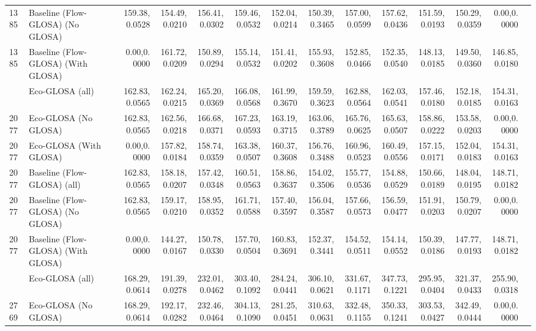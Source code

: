 \begin{table}[ht]
{\begin{tabular}{llrrrrrrrrrrrr}
        1385 & Baseline (Flow-GLOSA) (No GLOSA)   & 159.38,0.0528 & 154.49,0.0210 & 156.41,0.0302 & 159.46,0.0532 & 152.04,0.0214 & 150.39,0.3465 & 157.00,0.0599 & 157.62,0.0436 & 151.59,0.0193 & 150.29,0.0359 & 0.00,0.0000   \\
        1385 & Baseline (Flow-GLOSA) (With GLOSA) & 0.00,0.0000   & 161.72,0.0209 & 150.89,0.0294 & 155.14,0.0532 & 151.41,0.0202 & 155.93,0.3608 & 152.85,0.0466 & 152.35,0.0540 & 148.13,0.0185 & 149.50,0.0360 & 146.85,0.0180 \\
        \addlinespace
        2077 & Eco-GLOSA (all)                    & 162.83,0.0565 & 162.24,0.0215 & 165.20,0.0369 & 166.08,0.0568 & 161.99,0.3670 & 159.59,0.3623 & 162.88,0.0564 & 162.03,0.0541 & 157.46,0.0180 & 152.18,0.0185 & 154.31,0.0163 \\
        2077 & Eco-GLOSA (No GLOSA)               & 162.83,0.0565 & 162.56,0.0218 & 166.68,0.0371 & 167.23,0.0593 & 163.19,0.3715 & 163.06,0.3789 & 165.76,0.0625 & 165.63,0.0507 & 158.86,0.0222 & 153.58,0.0203 & 0.00,0.0000   \\
        2077 & Eco-GLOSA (With GLOSA)             & 0.00,0.0000   & 157.82,0.0184 & 158.74,0.0359 & 163.38,0.0507 & 160.37,0.3608 & 156.76,0.3488 & 160.96,0.0523 & 160.49,0.0556 & 157.15,0.0171 & 152.04,0.0183 & 154.31,0.0163 \\
        2077 & Baseline (Flow-GLOSA) (all)        & 162.83,0.0565 & 158.18,0.0207 & 157.42,0.0348 & 160.51,0.0563 & 158.86,0.3637 & 154.02,0.3506 & 155.77,0.0536 & 154.88,0.0529 & 150.66,0.0189 & 148.04,0.0195 & 148.71,0.0182 \\
        2077 & Baseline (Flow-GLOSA) (No GLOSA)   & 162.83,0.0565 & 159.17,0.0210 & 158.95,0.0352 & 161.71,0.0588 & 157.40,0.3597 & 156.04,0.3587 & 157.66,0.0573 & 156.59,0.0477 & 151.91,0.0203 & 150.79,0.0207 & 0.00,0.0000   \\
        2077 & Baseline (Flow-GLOSA) (With GLOSA) & 0.00,0.0000   & 144.27,0.0167 & 150.78,0.0330 & 157.70,0.0504 & 160.83,0.3691 & 152.37,0.3441 & 154.52,0.0511 & 154.14,0.0552 & 150.39,0.0186 & 147.77,0.0193 & 148.71,0.0182 \\
        \addlinespace
        2769 & Eco-GLOSA (all)                    & 168.29,0.0614 & 191.39,0.0278 & 232.01,0.0462 & 303.40,0.1092 & 284.24,0.0441 & 306.10,0.0621 & 331.67,0.1171 & 347.73,0.1221 & 295.95,0.0404 & 321.37,0.0433 & 255.90,0.0318 \\
        2769 & Eco-GLOSA (No GLOSA)               & 168.29,0.0614 & 192.17,0.0282 & 232.46,0.0464 & 304.13,0.1090 & 281.25,0.0451 & 310.63,0.0631 & 332.48,0.1155 & 350.33,0.1241 & 303.53,0.0427 & 342.49,0.0444 & 0.00,0.0000   \\

\end{tabular}}
\end{table}
